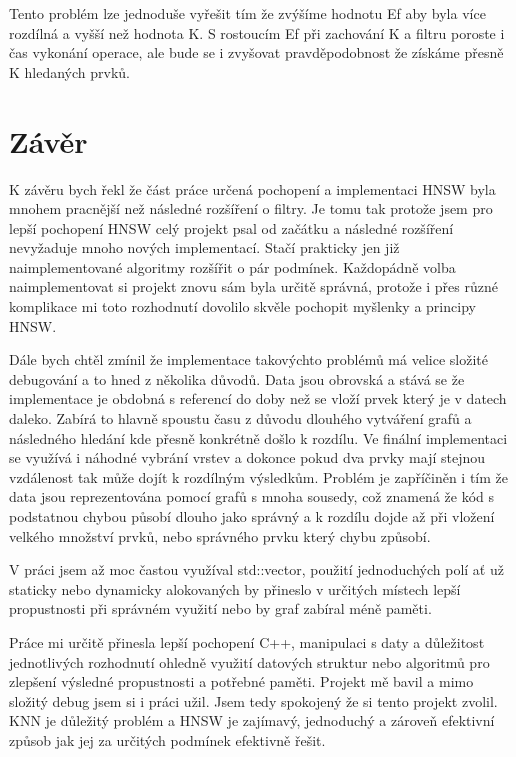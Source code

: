 \documentclass[czech,semestral,dept460,male,csharp,cpdeclaration]{diploma}
\begin{document}
			Tento problém lze jednoduše vyřešit tím že zvýšíme hodnotu Ef aby byla více rozdílná a vyšší než hodnota K. S rostoucím Ef při zachování K a filtru poroste i čas vykonání operace, ale bude se i zvyšovat pravděpodobnost že získáme přesně K hledaných prvků.
	
	\chapter{Závěr}
	\label{chap_zaver}
	
		K závěru bych řekl že část práce určená pochopení a implementaci HNSW byla mnohem pracnější než následné rozšíření o filtry. Je tomu tak protože jsem pro lepší pochopení HNSW celý projekt psal od začátku a následné rozšíření nevyžaduje mnoho nových implementací. Stačí prakticky jen již naimplementované algoritmy rozšířit o pár podmínek. Každopádně volba naimplementovat si projekt znovu sám byla určitě správná, protože i přes různé komplikace mi toto rozhodnutí dovolilo skvěle pochopit myšlenky a principy HNSW.
		
		Dále bych chtěl zmínil že implementace takovýchto problémů má velice složité debugování a to hned z několika důvodů. Data jsou obrovská a stává se že implementace je obdobná s referencí do doby než se vloží prvek který je v datech daleko. Zabírá to hlavně spoustu času z důvodu dlouhého vytváření grafů a následného hledání kde přesně konkrétně došlo k rozdílu. Ve finální implementaci se využívá i náhodné vybrání vrstev a dokonce pokud dva prvky mají stejnou vzdálenost tak může dojít k rozdílným výsledkům. Problém je zapříčiněn i tím že data jsou reprezentována pomocí grafů s mnoha sousedy, což znamená že kód s podstatnou chybou působí dlouho jako správný a k rozdílu dojde až při vložení velkého množství prvků, nebo správného prvku který chybu způsobí.
		
		V práci jsem až moc častou využíval std::vector, použití jednoduchých polí ať už staticky nebo dynamicky alokovaných by přineslo v určitých místech lepší propustnosti při správném využití nebo by graf zabíral méně paměti.
		
		Práce mi určitě přinesla lepší pochopení C++, manipulaci s daty a důležitost jednotlivých rozhodnutí ohledně využití datových struktur nebo algoritmů pro zlepšení výsledné propustnosti a potřebné paměti. Projekt mě bavil a mimo složitý debug jsem si i práci užil. Jsem tedy spokojený že si tento projekt zvolil. KNN je důležitý problém a HNSW je zajímavý, jednoduchý a zároveň efektivní způsob jak jej za určitých podmínek efektivně řešit.
	
	\nocite{*}
	
	\printbibliography[title={Literatura}, heading=bibintoc]
	
\end{document}

